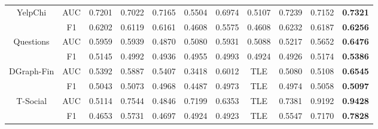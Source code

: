 \begin{table}[t]
{\begin{tabular}{cc|ccccccccc}
\multirow{2}{*}{YelpChi}    & AUC     & 0.7201 & 0.7022 & 0.7165          & 0.5504    & 0.6974 & 0.5107 & 0.7239          & 0.7152    & \textbf{0.7321} \\
                            & F1      & 0.6202 & 0.6119 & 0.6161          & 0.4608    & 0.5575 & 0.4608 & 0.6232          & 0.6187    & \textbf{0.6256} \\ \hline
\multirow{2}{*}{Questions}  & AUC     & 0.5959 & 0.5939 & 0.4870          & 0.5080    & 0.5931 & 0.5088 & 0.5217          & 0.5652    & \textbf{0.6476} \\
                            & F1      & 0.5145 & 0.4992 & 0.4936          & 0.4955    & 0.4993 & 0.4924 & 0.4926          & 0.5174    & \textbf{0.5386} \\ \hline
\multirow{2}{*}{DGraph-Fin} & AUC     & 0.5392 & 0.5887 & 0.5407          & 0.3418    & 0.6012 & TLE    & 0.5080          & 0.5108    & \textbf{0.6545} \\
                            & F1      & 0.5043 & 0.5073 & 0.4968          & 0.4487    & 0.4973 & TLE    & 0.4974          & 0.5058    & \textbf{0.5097} \\ \hline
\multirow{2}{*}{T-Social}   & AUC     & 0.5114 & 0.7544 & 0.4846          & 0.7199    & 0.6353 & TLE    & 0.7381          & 0.9192    & \textbf{0.9428} \\
                            & F1      & 0.4653 & 0.5731 & 0.4697          & 0.4924    & 0.4923 & TLE    & 0.5547          & 0.7170    & \textbf{0.7828} \\ \hline \hline
\end{tabular}
}
\end{table}